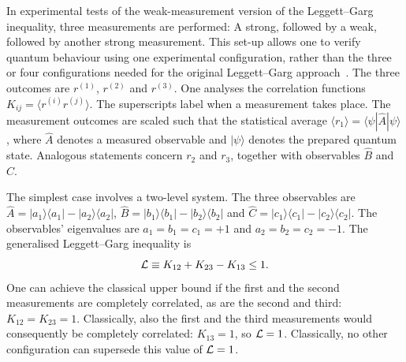 \documentclass[%
 reprint,
superscriptaddress,
nofootinbib,
bibnotes,
 amsmath,amssymb,
 aps,
]{revtex4-1}
\theoremstyle{plain}
\newcommand*{\ketbra}[2]{\lvert #1 \rangle\!\langle #2 \rvert}
\def\la{\langle}
\def\ra{\rangle}
\def\be{\begin{equation}}
\def\ee{\end{equation}}
\begin{document}
In experimental tests of the weak-measurement version of the Leggett--Garg inequality, three measurements are 
performed: A strong, followed by a weak, followed by another strong measurement. This set-up allows one to verify quantum behaviour using one experimental configuration, rather than the three or four configurations needed for the original Leggett--Garg approach~\cite{Leggett85}. 
The three outcomes are $r^{(1)}$, $r^{(2)}$ and $r^{(3)}$. One analyses the correlation functions $K_{ij} = \la r^{(i)} r^{(j)} \ra$.  The superscripts label when a measurement takes place. The measurement outcomes are scaled such that the statistical average $\la r_1 \ra = \la \psi |{\hat A}| \psi \ra $, where 
$\hat{A}$ denotes a measured observable and $|\psi\ra$ denotes the prepared quantum state. 
Analogous statements concern $r_2$ and $r_3$, together with observables ${\hat B}$ and ${\hat C}$. 

The simplest case involves a two-level system. The three observables are 
$\hat{A} = \ketbra{a_1}{a_1} - \ketbra{a_2}{a_2}$, 
$\hat{B} = \ketbra{b_1}{b_1} - \ketbra{b_2}{b_2}$ and 
$\hat{C} = \ketbra{c_1}{c_1} - \ketbra{c_2}{c_2}$.   
The observables' eigenvalues are $a_1=b_1=c_1=+1$ and $a_2=b_2=c_2=-1$. The generalised Leggett--Garg inequality is 
\be
{\cal L} \equiv  K_{12} + K_{23} - K_{13} \leq 1.
\ee
One can achieve the classical upper bound if
the first and the second measurements are completely correlated, as are the second and third: $K_{12} = K_{23} = 1$.  Classically, 
also the first and the third measurements would consequently be completely correlated: $K_{13} = 1$, so ${\cal L}=1$. Classically, no other configuration can supersede this value of  ${\cal L}=1$.
\end{document}
